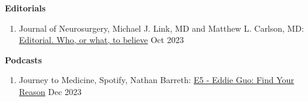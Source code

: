 \documentclass{article}
\begin{document}
\textbf{Editorials} \vspace{.5em}
\begin{enumerate}
    \item Journal of Neurosurgery, Michael J. Link, MD and Matthew L. Carlson, MD: \href{https://thejns.org/view/journals/j-neurosurg/139/4/article-p1001.xml}{Editorial. Who, or what, to believe} \hfill Oct 2023
\end{enumerate} \vspace{1em}

\textbf{Podcasts} \vspace{.5em}
\begin{enumerate}
    \item Journey to Medicine, Spotify, Nathan Barreth: \href{https://open.spotify.com/episode/61ah1zCA0stsM13zechA8C?si=ff46203a4e5a4721}{E5 - Eddie Guo: Find Your Reason} \hfill Dec 2023
\end{enumerate} \vspace{1em}
\end{document}
